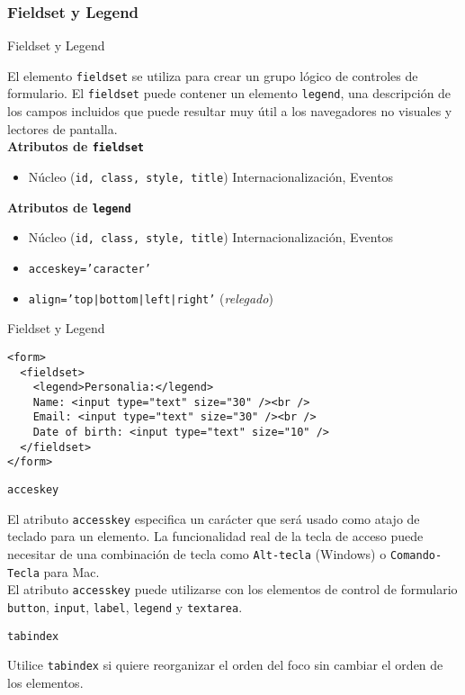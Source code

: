 \documentclass{beamer}
\begin{document}
\subsubsection{Fieldset y Legend} 
\begin{frame}{Fieldset y Legend} %

\footnotesize{
El elemento \texttt{fieldset} se utiliza para crear un grupo lógico de
controles de formulario. El \texttt{fieldset} puede contener un elemento
\texttt{legend}, una descripción de los campos incluidos que puede resultar muy
útil a los navegadores no visuales y lectores de pantalla.\\[0.5cm] 

    \textbf{Atributos de \texttt{fieldset}}
    \begin{itemize}
        \item Núcleo (\texttt{id, class, style, title}) Internacionalización,
        Eventos \\[0.5cm]
    \end{itemize}
    \textbf{Atributos de \texttt{legend}}
    \begin{itemize}
        \item Núcleo (\texttt{id, class, style, title}) Internacionalización,
        Eventos
        \item \texttt{acceskey='caracter'}
        \item \texttt{align='top|bottom|left|right'} (\textit{relegado})
    \end{itemize}

} 

\end{frame}

\begin{frame}[fragile]{Fieldset y Legend} %
\begin{lstlisting}
<form>
  <fieldset>
    <legend>Personalia:</legend>
    Name: <input type="text" size="30" /><br />
    Email: <input type="text" size="30" /><br />
    Date of birth: <input type="text" size="10" />
  </fieldset>
</form>
\end{lstlisting}
\end{frame}


\begin{frame}{\texttt{acceskey}} %

\begin{center}

    El atributo \texttt{accesskey} especifica un carácter que será usado como
    atajo de teclado para un elemento. La funcionalidad real de la tecla de
    acceso puede necesitar de una combinación de tecla como \texttt{Alt-tecla}
    (Windows) o \texttt{Comando-Tecla} para Mac. \\[0.5cm] 
    \pause
        El atributo \texttt{accesskey} puede utilizarse con los elementos de
    control de formulario \texttt{button},  \texttt{input},  \texttt{label},
    \texttt{legend} y \texttt{textarea}. 

\end{center}

\end{frame}


\begin{frame}{\texttt{tabindex}} %
    \begin{center}
        Utilice \texttt{tabindex} si quiere reorganizar el orden del foco sin
        cambiar el orden de los elementos.
    \end{center}
\end{frame}

\end{document}
